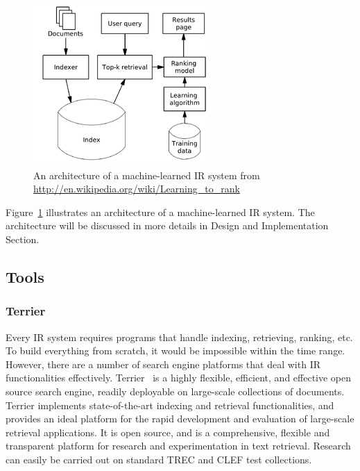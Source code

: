 \begin{figure}
\centering
\includegraphics[scale=0.7]{./figures/letor.png}
\caption{An architecture of a machine-learned IR system from \protect\url{http://en.wikipedia.org/wiki/Learning_to_rank}} \label{fig:letor} 
\end{figure}
Figure~\ref{fig:letor} illustrates an architecture of a machine-learned IR system. The architecture will be discussed in more details in Design and 
Implementation Section.

\subsection{Tools}
\subsubsection{Terrier}\label{section:terrier}
Every IR system requires programs that handle indexing, retrieving, ranking, etc. To build everything from scratch, it would be impossible within
the time range. However, there are a number of search engine platforms that deal with IR functionalities effectively.
Terrier~\cite{terrier} is a highly flexible, efficient, and effective open source search engine, readily deployable on large-scale collections of documents. 
Terrier implements state-of-the-art indexing and retrieval functionalities, and provides an ideal platform for the rapid development and evaluation 
of large-scale retrieval applications. It is open source, and is a comprehensive, flexible and transparent platform for research and 
experimentation in text retrieval. Research can easily be carried out on standard TREC and CLEF test collections.

